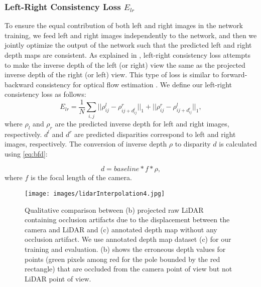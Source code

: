 \documentclass[letterpaper, 10 pt, conference]{ieeeconf}
\begin{document}
\subsubsection{Left-Right Consistency Loss $E_{lr}$}To ensure the equal contribution of both left and right images in the network training, we feed left and right images independently to the network, and then we jointly optimize the output of the network such that the predicted left and right depth maps are consistent. As explained in \cite{godard2017unsupervised}, left-right consistency loss attempts to make the inverse depth of the left (or right) view the same as the projected inverse depth of the right (or left) view. This type of loss is similar to forward-backward consistency for optical flow estimation \cite{meister2018unflow}. We define our left-right consistency loss as follows:\\
\begin{equation}
E_{lr}=\frac{1}{N}\sum\limits_{i,j} || \rho_{ij}^{l} - \rho_{ij+d_{ij}^{l}}^{r} ||_{1} + || \rho_{ij}^{r} - \rho_{ij+d_{ij}^{r}}^{l} ||_{1},
\end{equation}
where $\rho_{l}$ and $\rho_{r}$ are the predicted inverse depth for left and right images, respectively. $d^{l}$ and $d^{r}$ are predicted disparities correspond to left and right images, respectively. The conversion of inverse depth $\rho$ to disparity $d$ is calculated using \eqref{eq:bfd}:

\begin{equation}\label{eq:bfd}
    d = baseline * f * \rho ,
\end{equation}
where $f$ is the focal length of the camera.
\\
\begin{figure*} [t]
        \centering
        \texttt{[image: images/lidarInterpolation4.jpg]}
        \caption{Qualitative comparison between (b) projected raw LiDAR containing occlusion artifacts due to the displacement between the camera and LiDAR and (c) annotated depth map without any occlusion artifact. We use annotated depth map dataset (c) for our training and evaluation. (b) shows the erroneous depth values for points (green pixels among red for the pole bounded by the red rectangle) that are occluded from the camera point of view but not LiDAR point of view.}
        \label{fig:occlusion}
\end{figure*}
  


   
    
\end{document}
